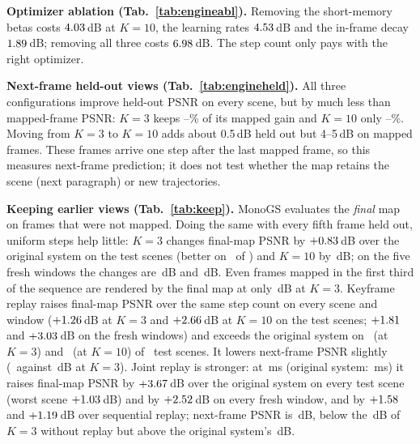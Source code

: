 \documentclass[10pt,twocolumn,letterpaper]{article}
\begin{document}
\textbf{Optimizer ablation (Tab.~\ref{tab:engineabl}).} Removing the short-memory betas costs $4.03$\,dB at $K{=}10$, the learning rates $4.53$\,dB and the in-frame decay $1.89$\,dB; removing all three costs $6.98$\,dB. The step count only pays with the right optimizer.



\textbf{Next-frame held-out views (Tab.~\ref{tab:engineheld}).} All three configurations improve held-out PSNR on every scene, but by much less than mapped-frame PSNR: $K{=}3$ keeps \engRetFixkThreeMin--\engRetFixkThreeMax\% of its mapped gain and $K{=}10$ only \engRetFixkOneZeroMin--\engRetFixkOneZeroMax\%. Moving from $K{=}3$ to $K{=}10$ adds about 0.5\,dB held out but 4--5\,dB on mapped frames. These frames arrive one step after the last mapped frame, so this measures next-frame prediction; it does not test whether the map retains the scene (next paragraph) or new trajectories.



\textbf{Keeping earlier views (Tab.~\ref{tab:keep}).} MonoGS evaluates the \emph{final} map on frames that were not mapped. Doing the same with every fifth frame held out, uniform steps help little: $K{=}3$ changes final-map PSNR by $+0.83$\,dB over the original system on the test scenes (better on \engKeepDTestKThreeMinusOrigPos\ of \engKeepTestN) and $K{=}10$ by \engKeepDTestKOneZeroMinusOrigMean\,dB; on the five fresh windows the changes are \engKeepDFreshKThreeMinusOrigMean\,dB and \engKeepDFreshKOneZeroMinusOrigMean\,dB. Even frames mapped in the first third of the sequence are rendered by the final map at only \engKeepTestKThreeMappedEarlyFinal\,dB at $K{=}3$. Keyframe replay raises final-map PSNR over the same step count on every scene and window ($+1.26$\,dB at $K{=}3$ and $+2.66$\,dB at $K{=}10$ on the test scenes; $+1.81$ and $+3.03$\,dB on the fresh windows) and exceeds the original system on \engKeepDTestKThreeRpMinusOrigPos\ (at $K{=}3$) and \engKeepDTestKOneZeroRpMinusOrigPos\ (at $K{=}10$) of \engKeepTestN\ test scenes. It lowers next-frame PSNR slightly (\engKeepTestKThreeRpHeldoutCausal\ against \engKeepTestKThreeHeldoutCausal\,dB at $K{=}3$). Joint replay is stronger: at \engMsKThreeJr\,ms (original system: \engMsOrig\,ms) it raises final-map PSNR by $+3.67$\,dB over the original system on every test scene (worst scene $+1.03$\,dB) and by $+2.52$\,dB on every fresh window, and by $+1.58$ and $+1.19$\,dB over sequential replay; next-frame PSNR is \engKeepTestKThreeJrHeldoutCausal\,dB, below the \engKeepTestKThreeHeldoutCausal\,dB of $K{=}3$ without replay but above the original system's \engKeepTestOrigHeldoutCausal\,dB.
\end{document}
